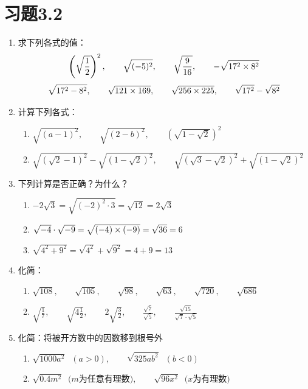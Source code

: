 \section*{习题3.2}
\begin{enumerate}
    \item 求下列各式的值：
\[\left(\sqrt{\dfrac{1}{2}}\right)^2,\qquad \sqrt{(-5)^2},\qquad \sqrt{\dfrac{9}{16}},\qquad -\sqrt{17^2\times 8^2}  \]
\[\sqrt{17^2-8^2},\qquad \sqrt{121\times 169},\qquad \sqrt{256\times 225},\qquad \sqrt{17^2}-\sqrt{8^2}\]

\item 计算下列各式：
\begin{enumerate}
    \item $\sqrt{(a-1)^2},\qquad \sqrt{(2-b)^2},\qquad \left(\sqrt{1-\sqrt{2}}\right)^2$
    \item $\sqrt{\left(\sqrt{2}-1\right)^2}-\sqrt{\left(1-\sqrt{2}\right)^2},\qquad \sqrt{\left(\sqrt{3}-\sqrt{2}\right)^2}+\sqrt{\left(1-\sqrt{2}\right)^2}$
\end{enumerate}

\item 下列计算是否正确？为什么？
\begin{enumerate}
    \item $-2\sqrt{3}=\sqrt{(-2)^2\cdot 3}=\sqrt{12}=2\sqrt{3}$
    \item $\sqrt{-4}\cdot \sqrt{-9}=\sqrt{(-4)\times(-9)}=\sqrt{36}=6$
    \item $\sqrt{4^2+9^2}=\sqrt{4^2}+\sqrt{9^2}=4+9=13$
\end{enumerate}

\item 化简：
\begin{enumerate}
    \item $\sqrt{108},\qquad \sqrt{105},\qquad \sqrt{98},\qquad \sqrt{63},\qquad \sqrt{720},\qquad \sqrt{686}$
    \item $\sqrt{\frac{1}{7}},\qquad \sqrt{4\frac{1}{2}},\qquad 2\sqrt{\frac{3}{2}},\qquad \frac{\sqrt{7}}{\sqrt{5}},\qquad \frac{\sqrt{15}}{\sqrt{7}\cdot \sqrt{5}}$
\end{enumerate}

\item 化简：将被开方数中的因数移到根号外
\begin{enumerate}
    \item $\sqrt{1000a^2}\;\; (a>0),\qquad \sqrt{325ab^2}\;\; (b<0)$
    \item $\sqrt{0.4m^2}\;\; \text{($m$为任意有理数)},\qquad \sqrt{96x^2}\;\;\text{($x$为有理数)}$
\end{enumerate}


\end{enumerate}

